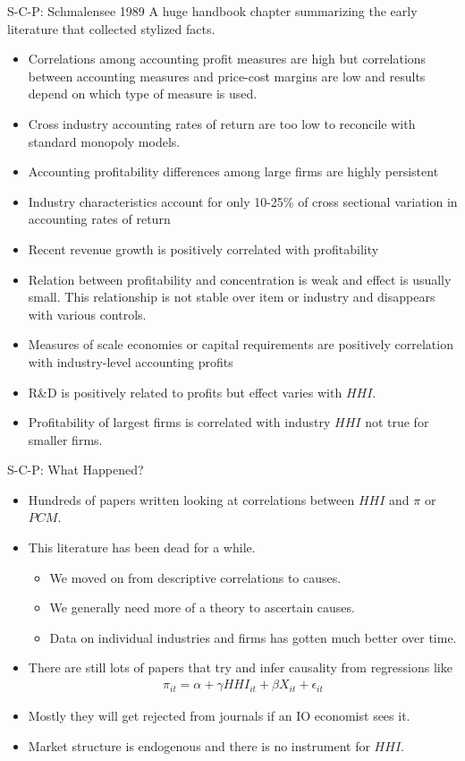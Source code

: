 \documentclass[xcolor=pdftex,dvipsnames,table,mathserif]{beamer}
\begin{document}
\begin{frame}{S-C-P: Schmalensee 1989}
A huge handbook chapter summarizing the early literature that collected stylized facts.
\footnotesize
\begin{itemize}
\item Correlations among accounting profit measures are high but correlations between accounting measures and price-cost margins are low and results depend on which type of measure is used.
\item Cross industry accounting rates of return are too low to reconcile with standard monopoly models.
\item Accounting profitability differences among large firms are highly persistent
\item Industry characteristics account for only 10-25\% of cross sectional variation in accounting rates of return
\item Recent revenue growth is positively correlated with profitability
\item Relation between profitability and concentration is weak and effect is usually small. This relationship is not stable over item or industry and disappears with various controls.
\item Measures of scale economies or capital requirements are positively correlation with industry-level accounting profits
\item R\&D is positively related to profits but effect varies with $HHI$.
\item Profitability of largest firms is correlated with industry $HHI$ not true for smaller firms.
\end{itemize}
\end{frame}

\begin{frame}{S-C-P: What Happened?}

\begin{itemize}
\item Hundreds of papers written looking at correlations between $HHI$ and $\pi$ or $PCM$.
\item This literature has been dead for a while.
\begin{itemize}
\item We moved on from descriptive correlations to causes.
\item We generally need more of a theory to ascertain causes.
\item Data on individual industries and firms has gotten much better over time.
\end{itemize}
\item There are still lots of papers that try and infer causality from regressions like 
\begin{eqnarray*}
\pi_{it} = \alpha + \gamma HHI_{it} + \beta X_{it} + \epsilon_{it} 
\end{eqnarray*}
\item Mostly they will get rejected from journals if an IO economist sees it.
\item Market structure is endogenous and there is no instrument for $HHI$.
\end{itemize}
\end{frame}
\end{document}
